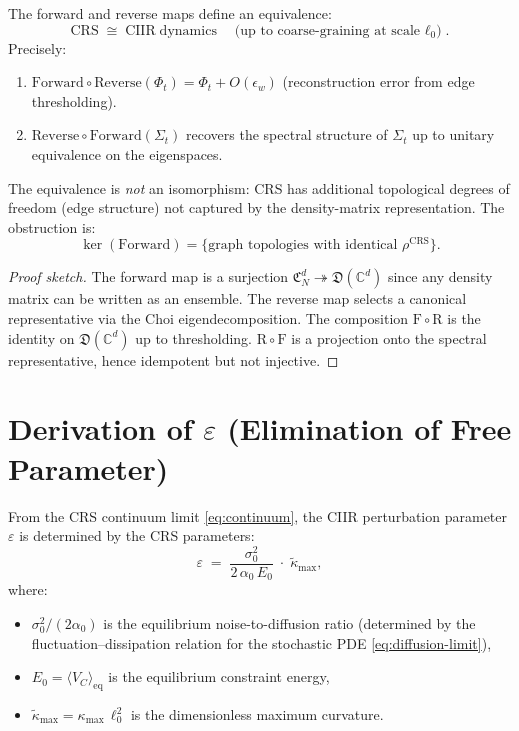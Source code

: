 \begin{theorem}\label{thm:12.9}
The forward and reverse maps define an equivalence:
\[
  \mathrm{CRS} \;\cong\; \mathrm{CIIR\;dynamics}
  \quad\text{(up to coarse-graining at scale $\ell_0$)}.
\]
Precisely:
\begin{enumerate}
  \item $\mathrm{Forward} \circ \mathrm{Reverse}(\Phi_t)
    = \Phi_t + O(\epsilon_w)$ (reconstruction error from edge thresholding).
  \item $\mathrm{Reverse} \circ \mathrm{Forward}(\Sigma_t)$
    recovers the spectral structure of $\Sigma_t$ up to unitary
    equivalence on the eigenspaces.
\end{enumerate}
The equivalence is \emph{not} an isomorphism: CRS has additional
topological degrees of freedom (edge structure) not captured by the
density-matrix representation.  The obstruction is:
\[
  \ker(\mathrm{Forward}) = \{\text{graph topologies with identical } \rho^{\mathrm{CRS}}\}.
\]
\end{theorem}

\begin{proof}[Proof sketch]
The forward map is a surjection $\mathfrak{C}_N^d \twoheadrightarrow
\mathfrak{D}(\mathbb{C}^d)$ since any density matrix can be written as
an ensemble.  The reverse map selects a canonical representative via
the Choi eigendecomposition.  The composition $\mathrm{F} \circ \mathrm{R}$
is the identity on $\mathfrak{D}(\mathbb{C}^d)$ up to thresholding.
$\mathrm{R} \circ \mathrm{F}$ is a projection onto the spectral
representative, hence idempotent but not injective.
\end{proof}

\section{Derivation of \texorpdfstring{$\varepsilon$}{epsilon}
  (Elimination of Free Parameter)}
\label{sec:epsilon}

\begin{theorem}\label{thm:12.10}
From the CRS continuum limit \eqref{eq:continuum}, the CIIR perturbation
parameter $\varepsilon$ is determined by the CRS parameters:
\begin{equation}\label{eq:epsilon-derived}
  \varepsilon \;=\; \frac{\sigma_0^2}{2\,\alpha_0\,E_0}
  \;\cdot\; \tilde{\kappa}_{\max},
\end{equation}
where:
\begin{itemize}
  \item $\sigma_0^2 / (2\alpha_0)$ is the equilibrium noise-to-diffusion
    ratio (determined by the fluctuation--dissipation relation for the
    stochastic PDE \eqref{eq:diffusion-limit}),
  \item $E_0 = \langle V_C \rangle_{\mathrm{eq}}$ is the equilibrium
    constraint energy,
  \item $\tilde{\kappa}_{\max} = \kappa_{\max}\,\ell_0^2$ is the
    dimensionless maximum curvature.
\end{itemize}
\end{theorem}

